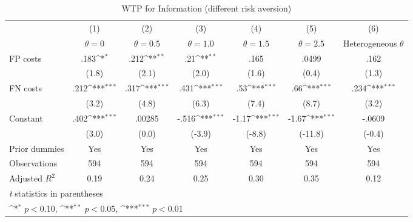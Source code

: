 \begin{table}[htbp]\centering
\def\sym#1{\ifmmode^{#1}\else\(^{#1}\)\fi}
\caption{WTP for Information (different risk aversion)}
\begin{tabular}{l*{6}{c}}
\hline\hline
                &\multicolumn{1}{c}{(1)}&\multicolumn{1}{c}{(2)}&\multicolumn{1}{c}{(3)}&\multicolumn{1}{c}{(4)}&\multicolumn{1}{c}{(5)}&\multicolumn{1}{c}{(6)}\\
                &\multicolumn{1}{c}{$\theta=0$}&\multicolumn{1}{c}{$\theta=0.5$}&\multicolumn{1}{c}{$\theta=1.0$}&\multicolumn{1}{c}{$\theta=1.5$}&\multicolumn{1}{c}{$\theta=2.5$}&\multicolumn{1}{c}{Heterogeneous $\theta$}\\
\hline
FP costs        &     .183\sym{*}  &     .212\sym{**} &      .21\sym{**} &     .165         &    .0499         &     .162         \\
                &    (1.8)         &    (2.1)         &    (2.0)         &    (1.6)         &    (0.4)         &    (1.3)         \\
FN costs        &     .212\sym{***}&     .317\sym{***}&     .431\sym{***}&      .53\sym{***}&      .66\sym{***}&     .234\sym{***}\\
                &    (3.2)         &    (4.8)         &    (6.3)         &    (7.4)         &    (8.7)         &    (3.2)         \\
Constant        &     .402\sym{***}&   .00285         &    -.516\sym{***}&    -1.17\sym{***}&    -1.67\sym{***}&   -.0609         \\
                &    (3.0)         &    (0.0)         &   (-3.9)         &   (-8.8)         &  (-11.8)         &   (-0.4)         \\
Prior dummies   &      Yes         &      Yes         &      Yes         &      Yes         &      Yes         &      Yes         \\
\hline
Observations    &      594         &      594         &      594         &      594         &      594         &      594         \\
Adjusted \(R^{2}\)&     0.19         &     0.24         &     0.25         &     0.30         &     0.35         &     0.12         \\
\hline\hline
\multicolumn{7}{l}{\footnotesize \textit{t} statistics in parentheses}\\
\multicolumn{7}{l}{\footnotesize \sym{*} \(p<0.10\), \sym{**} \(p<0.05\), \sym{***} \(p<0.01\)}\\
\end{tabular}
\end{table}
